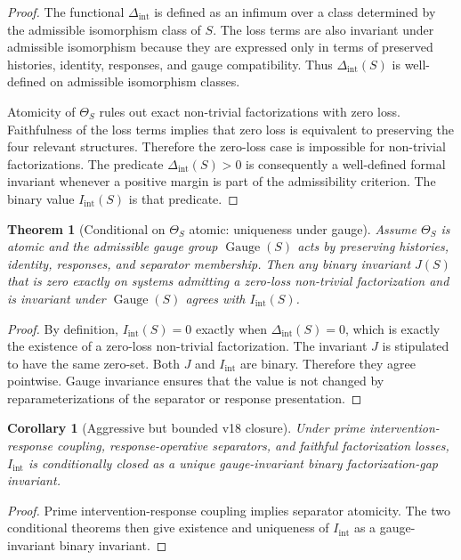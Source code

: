 \documentclass[11pt]{article}
\newtheorem{theorem}[definition]{Theorem}
\newtheorem{corollary}[definition]{Corollary}
\newcommand{\QGauge}{\operatorname{Gauge}}
\newcommand{\Iint}{I_{\mathrm{int}}}
\begin{document}
\begin{proof}
The functional $\Delta_{\mathrm{int}}$ is defined as an infimum over a class determined by the admissible isomorphism class of $S$. The loss terms are also invariant under admissible isomorphism because they are expressed only in terms of preserved histories, identity, responses, and gauge compatibility. Thus $\Delta_{\mathrm{int}}(S)$ is well-defined on admissible isomorphism classes.

Atomicity of $\Theta_S$ rules out exact non-trivial factorizations with zero loss. Faithfulness of the loss terms implies that zero loss is equivalent to preserving the four relevant structures. Therefore the zero-loss case is impossible for non-trivial factorizations. The predicate $\Delta_{\mathrm{int}}(S)>0$ is consequently a well-defined formal invariant whenever a positive margin is part of the admissibility criterion. The binary value $\Iint(S)$ is that predicate.
\end{proof}

\begin{theorem}[Conditional on $\Theta_S$ atomic: uniqueness under gauge]
Assume $\Theta_S$ is atomic and the admissible gauge group $\QGauge(S)$ acts by preserving histories, identity, responses, and separator membership. Then any binary invariant $J(S)$ that is zero exactly on systems admitting a zero-loss non-trivial factorization and is invariant under $\QGauge(S)$ agrees with $\Iint(S)$.
\end{theorem}

\begin{proof}
By definition, $\Iint(S)=0$ exactly when $\Delta_{\mathrm{int}}(S)=0$, which is exactly the existence of a zero-loss non-trivial factorization. The invariant $J$ is stipulated to have the same zero-set. Both $J$ and $\Iint$ are binary. Therefore they agree pointwise. Gauge invariance ensures that the value is not changed by reparameterizations of the separator or response presentation.
\end{proof}

\begin{corollary}[Aggressive but bounded v18 closure]
Under prime intervention-response coupling, response-operative separators, and faithful factorization losses, $\Iint$ is conditionally closed as a unique gauge-invariant binary factorization-gap invariant.
\end{corollary}

\begin{proof}
Prime intervention-response coupling implies separator atomicity. The two conditional theorems then give existence and uniqueness of $\Iint$ as a gauge-invariant binary invariant.
\end{proof}
\end{document}
